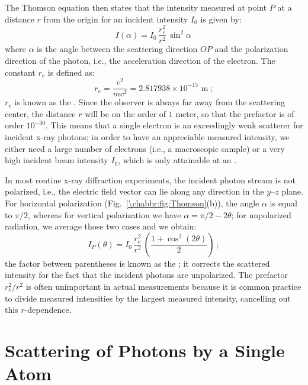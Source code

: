 The Thomson equation then states that the intensity measured at point $P$ at a distance $r$ from the origin for an incident intensity $I_0$ is given by:
\begin{equation}
	I(\alpha) = I_0\,\frac{r_e^2}{r^2}\,\sin^2\alpha\, 
\end{equation}
where $\alpha$ is the angle between the scattering direction $OP$ and the polarization direction of the photon, i.e., the acceleration direction of the electron.  The constant $r_e$ is defined as:
\[
	r_e = \frac{e^2}{mc^2} = 2.817938\times 10^{-15}\text{ m}\ ;
\]
$r_e$ is known as the .  Since the observer is always far away from the scattering center, the distance $r$ will be on the order of $1$ meter, so that the prefactor is of order $10^{-30}$. This means that a single electron is an exceedingly weak scatterer for incident x-ray photons; in order to have an appreciable measured intensity, we either need a large number of electrons (i.e., a macroscopic sample) or a very high incident beam intensity $I_0$, which is only attainable at an . 

In most routine x-ray diffraction experiments, the incident photon stream is not polarized, i.e., the electric field vector can lie along any direction in the $y$--$z$ plane. For horizontal polarization (Fig.~\ref{\chabbr:fig:Thomson}(b)), the angle $\alpha$ is equal to $\pi/2$, whereas for vertical polarization we have $\alpha=\pi/2-2\theta$; for unpolarized radiation, we average those two cases and we obtain:
\begin{equation}
	I_P(\theta) =  I_0\,\frac{r_e^2}{r^2}\,\left(\frac{1+\cos^2(2\theta)}{2}\right)\ ;\label{\chabbr:eq:ThomsonUP}
\end{equation}
the factor between parentheses is known as the ; it corrects the scattered intensity for the fact that the incident photons are unpolarized.  The prefactor $r_e^2/r^2$ is often unimportant in actual measurements because it is common practice to divide measured intensities by the largest measured intensity, cancelling out this $r$-dependence.  


\section{Scattering of Photons by a Single Atom}\label{\chabbr:sec:atomscat}

